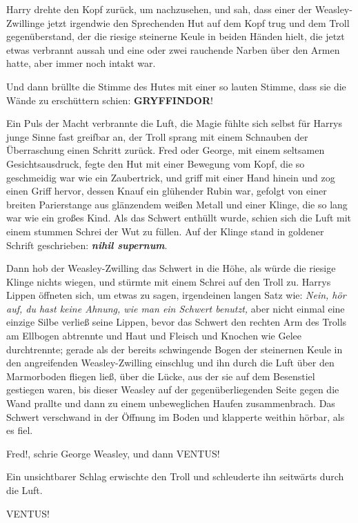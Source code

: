 Harry drehte den Kopf zurück, um nachzusehen, und sah, dass einer der
Weasley-Zwillinge jetzt irgendwie den Sprechenden Hut auf dem Kopf trug und dem
Troll gegenüberstand, der die riesige steinerne Keule in beiden Händen hielt,
die jetzt etwas verbrannt aussah und eine oder zwei rauchende Narben über den
Armen hatte, aber immer noch intakt war.

Und dann brüllte die Stimme des Hutes mit einer so lauten Stimme, dass sie die
Wände zu erschüttern schien: \glqq \textbf{GRYFFINDOR}!\grqq{}

Ein Puls der Macht verbrannte die Luft, die Magie fühlte sich selbst für Harrys
junge Sinne fast greifbar an, der Troll sprang mit einem Schnauben der
Überraschung einen Schritt zurück. Fred oder George, mit einem seltsamen
Gesichtsausdruck, fegte den Hut mit einer Bewegung vom Kopf, die so geschmeidig
war wie ein Zaubertrick, und griff mit einer Hand hinein und zog einen Griff
hervor, dessen Knauf ein glühender Rubin war, gefolgt von einer breiten
Parierstange aus glänzendem weißen Metall und einer Klinge, die so lang war wie
ein großes Kind. Als das Schwert enthüllt wurde, schien sich die Luft mit einem
stummen Schrei der Wut zu füllen. Auf der Klinge stand in goldener Schrift
geschrieben: \textbf{\emph{nihil supernum}}.

Dann hob der Weasley-Zwilling das Schwert in die Höhe, als würde die riesige
Klinge nichts wiegen, und stürmte mit einem Schrei auf den Troll zu. Harrys
Lippen öffneten sich, um etwas zu sagen, irgendeinen langen Satz wie:
\emph{Nein, hör auf, du hast keine Ahnung, wie man ein Schwert benutzt,} aber
nicht einmal eine einzige Silbe verließ seine Lippen, bevor das Schwert den
rechten Arm des Trolls am Ellbogen abtrennte und Haut und Fleisch und Knochen
wie Gelee durchtrennte; gerade als der bereits schwingende Bogen der steinernen
Keule in den angreifenden Weasley-Zwilling einschlug und ihn durch die Luft über
den Marmorboden fliegen ließ, über die Lücke, aus der sie auf dem Besenstiel
gestiegen waren, bis dieser Weasley auf der gegenüberliegenden Seite gegen die
Wand prallte und dann zu einem unbeweglichen Haufen zusammenbrach. Das Schwert
verschwand in der Öffnung im Boden und klapperte weithin hörbar, als es fiel.

\glqq Fred!\grqq{}, schrie George Weasley, und dann \glqq VENTUS!\grqq{}

Ein unsichtbarer Schlag erwischte den Troll und schleuderte ihn seitwärts durch
die Luft.

\glqq VENTUS!\grqq{}

